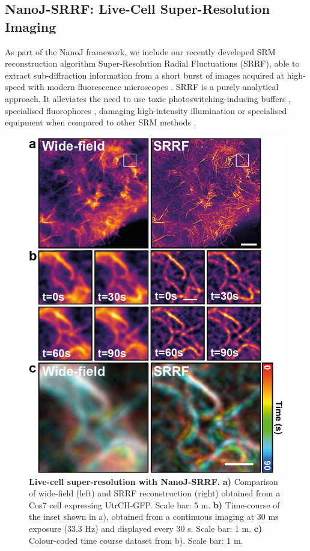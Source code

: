 \subsection*{NanoJ-SRRF: Live-Cell Super-Resolution Imaging}

 As part of the NanoJ framework, we include our recently developed SRM reconstruction algorithm Super-Resolution Radial Fluctuations (SRRF), able to extract sub-diffraction information from a short burst of images acquired at high-speed with modern fluorescence microscopes \cite{gustafsson2016fast,culley2018srrf}. SRRF is a purely analytical approach. It alleviates the need to use toxic photoswitching-inducing buffers \cite{henriques2011palm}, specialised fluorophores \cite{dempsey2011evaluation,henriques2009palm}, damaging high-intensity illumination \cite{waldchen2015light} or specialised equipment \cite{gustafsson2000surpassing,hell1994breaking} when compared to other SRM methods \cite{betzig2006imaging,rust2006sub,gustafsson2000surpassing,hell1994breaking}.
 
 \begin{figure}[!b]
    \centering
    \includegraphics{Figures/FigureSRRF_v4.png}
    \caption{\textbf{Live-cell super-resolution with NanoJ-SRRF.} \textbf{a)} Comparison of wide-field (left) and SRRF reconstruction (right) obtained from a Cos7 cell expressing UtrCH-GFP. Scale bar: 5 \micro m. \textbf{b)} Time-course of the inset shown in a), obtained from  a continuous imaging at 30 ms exposure (33.3 Hz) and displayed every 30 s. Scale bar: 1 \micro m. \textbf{c)} Colour-coded time course dataset from b). Scale bar: 1 \micro m.}
    \label{fig:SRRF}
 \end{figure}
 
